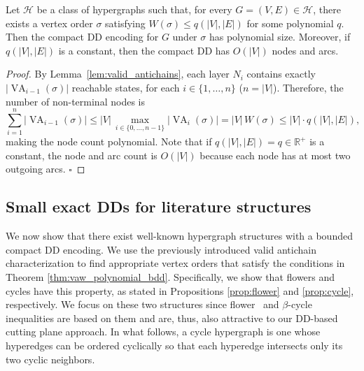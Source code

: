 \begin{theorem}
\label{thm:vaw_polynomial_bdd}
Let $\mathcal{H}$ be a class of hypergraphs such that, for every
$G=(V,E)\in\mathcal{H}$, there exists a vertex order $\sigma$ satisfying
$W(\sigma) \le q(|V|,|E|) $
for some polynomial $q$. Then the compact DD encoding for $G$ under $\sigma$ has polynomial size. Moreover, if $q(|V|,|E|)$ is a constant, then the compact DD has $O(|V|)$ nodes and arcs.
\end{theorem}

\begin{proof}
By Lemma~\ref{lem:valid_antichains}, each layer $N_i$ contains exactly
$|\operatorname{VA}_{i-1}(\sigma)|$ reachable states, for each $i\in \{1,\ldots,n\}$ ($n = |V|$). Therefore, the number of non-terminal nodes is
\[
\sum_{i=1}^{n} |\operatorname{VA}_{i-1}(\sigma)|
\le |V|\,\max_{i\in \{0,\ldots,n-1\}} |\operatorname{VA}_i(\sigma)|  = |V|\,W(\sigma) \leq |V|\cdot  q(|V|,|E|),
\]
making the node count polynomial. Note that if $q(|V|,|E|) = q \in \mathbb{R}^+$ is a constant, the node and arc count is $O(|V|)$ because each node has at most two outgoing arcs. \hfill$\square$
\end{proof}


\subsection{Small exact DDs for literature structures}
\label{subsec:small_bdds_literature}

We now show that there exist well-known hypergraph structures with a bounded compact DD encoding. We use the previously introduced valid antichain characterization to find appropriate vertex orders that satisfy the conditions in Theorem \ref{thm:vaw_polynomial_bdd}. Specifically, we show that flowers and cycles have this property, as stated in Propositions \ref{prop:flower} and \ref{prop:cycle}, respectively. We focus on these two structures since flower~\cite{delPiaKhajavirad2018acyclic} and  $\beta$-cycle~\cite{delPiaDiGregorio2021chvatal,delPiaWalter2024simple} inequalities are based on them and are, thus, also attractive to our DD-based cutting plane approach. In what follows, a cycle hypergraph is one whose hyperedges can be ordered cyclically so that each hyperedge intersects only its two cyclic neighbors.


